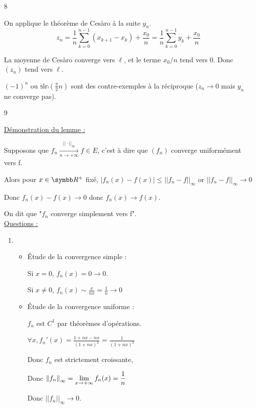 \begin{correction}{8}

On applique le théorème de Cesàro à la suite $y_{n}$.
\[z_n = \frac{1}{n} \sum_{k=0}^{n-1} (x_{k+1}-x_k) + \frac{x_0}{n} = \frac{1}{n} \sum_{k=0}^{n-1} y_k + \frac{x_0}{n}\]

La moyenne de Cesàro converge vers $\ell$, et le terme $x_0/n$ tend vers 0. Donc $(z_n)$ tend vers $\ell$.

$(-1)^n$ ou $\mathbb{sin}(\frac{\pi}2 n)$ sont des contre-exemples à la réciproque ($z_n \to 0$ mais $y_n$ ne converge pas).
\end{correction}

\begin{correction}{9}

\uline{Démonstration du lemme :}

Supposons que $f_n \xrightarrow[n\to+\infty]{||\cdot||_{\infty}} f \in E$, c'est à dire que $(f_n)$ converge uniformément vers f.

Alors pour $x \in \R^{+}$ fixé, $|f_n(x) - f(x)| \leqslant ||f_n - f||_{\infty}$ or $||f_n - f||_{\infty} \rightarrow 0$

Donc $f_n(x) - f(x) \rightarrow 0$ donc $f_n(x) \rightarrow f(x)$.

On dit que "$f_n$ converge simplement vers f".\\

\uline{Questions :}
\begin{enumerate}
    \item~
    \begin{itemize}
        \item Étude de la convergence simple :

        Si $x = 0$, $f_n(x) = 0 \rightarrow 0$.

        Si $x \not \equal 0$, $f_n(x) \sim \frac{x}{nx} = \frac 1 n \rightarrow 0$

        \item Étude de la convergence uniforme :

        $f_n$ est $C^1$ par théorèmes d'opérations.

        $\forall x, f_n'(x) = \frac{1 + nx - nx}{(1 + nx)^2} = \frac 1 {(1 + nx)^2}$

        Donc $f_n$ est strictement croissante,
        
        Donc $\left\|f_n\right\|_\infty = \displaystyle\lim_{x\to+\infty}f_n(x) = \frac{1}{n}$

        Donc $||f_n||_{\infty} \rightarrow 0$.


\end{itemize}
\end{enumerate}
\end{correction}

